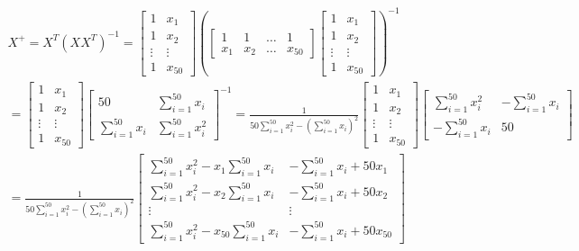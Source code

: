 \documentclass[letterpaper,headings=standardclasses]{scrartcl}
\begin{document}
\begin{multline*}
X^{+} = X^T \left( XX^T \right)^{-1} = \left[ \begin{matrix} 1 & x_1 \\ 1 & x_2 \\ \vdots & \vdots \\ 1 & x_{50} \end{matrix} \right] \left( \left[ \begin{matrix} 1 & 1 & \dots & 1 \\ x_1 & x_2 & \dots & x_{50} \end{matrix} \right] \left[ \begin{matrix} 1 & x_1 \\ 1 & x_2 \\ \vdots & \vdots \\ 1 & x_{50} \end{matrix} \right] \right)^{-1} \\
= \left[ \begin{matrix} 1 & x_1 \\ 1 & x_2 \\ \vdots & \vdots \\ 1 & x_{50} \end{matrix} \right] \left[ \begin{matrix} 50 & \sum_{i = 1}^{50} x_i \\[0.5em] \sum_{i = 1}^{50} x_i & \sum_{i = 1}^{50} x_i^2 \end{matrix} \right]^{-1} = \frac{1}{50 \sum_{i = 1}^{50} x_i^2 - \left( \sum_{i = 1}^{50} x_i \right)^2} \left[ \begin{matrix} 1 & x_1 \\ 1 & x_2 \\ \vdots & \vdots \\ 1 & x_{50} \end{matrix} \right] \left[ \begin{matrix} \sum_{i = 1}^{50} x_i^2 & -\sum_{i = 1}^{50} x_i \\[0.5em] -\sum_{i = 1}^{50} x_i & 50 \end{matrix} \right] \\
= \frac{1}{50 \sum_{i = 1}^{50} x_i^2 - \left( \sum_{i = 1}^{50} x_i \right)^2} \left[ \begin{matrix} \sum_{i = 1}^{50} x_i^2 - x_1 \sum_{i = 1}^{50} x_i & -\sum_{i = 1}^{50} x_i + 50 x_1 \\[0.5em] \sum_{i = 1}^{50} x_i^2 - x_2 \sum_{i = 1}^{50} x_i & -\sum_{i = 1}^{50} x_i + 50 x_2 \\[0.5em] \vdots & \vdots \\[0.5em] \sum_{i = 1}^{50} x_i^2 - x_{50} \sum_{i = 1}^{50} x_i & -\sum_{i = 1}^{50} x_i + 50 x_{50} \end{matrix} \right]
\end{multline*}
\end{document}
